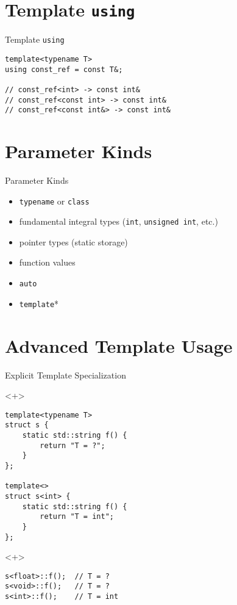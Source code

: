 \documentclass[table]{beamer}
\begin{document}
\section{Template \texttt{using}}

\begin{frame}[fragile]{Template \texttt{using}}
\begin{verbatim}
template<typename T>
using const_ref = const T&;

// const_ref<int> -> const int&
// const_ref<const int> -> const int&
// const_ref<const int&> -> const int&
  \end{verbatim}
\end{frame}

\section{Parameter Kinds}

\begin{frame}{Parameter Kinds}
  \begin{itemize}
  \item<+-> \texttt{typename} or \texttt{class}
  \item<+-> fundamental integral types (\texttt{int}, \texttt{unsigned int},
    etc.)
  \item<+-> pointer types (static storage)
  \item<+-> function values
  \item<+-> \texttt{auto}
  \item<+-> \texttt{template}*
  \end{itemize}
\end{frame}

\section{Advanced Template Usage}

\begin{frame}[fragile]{Explicit Template Specialization}
  \begin{onlyenv}<+>
    \begin{verbatim}
template<typename T>
struct s {
    static std::string f() {
        return "T = ?";
    }
};

template<>
struct s<int> {
    static std::string f() {
        return "T = int";
    }
};
    \end{verbatim}
  \end{onlyenv}

  \begin{onlyenv}<+>
    \begin{verbatim}
s<float>::f();  // T = ?
s<void>::f();   // T = ?
s<int>::f();    // T = int
    \end{verbatim}
  \end{onlyenv}
\end{frame}
\end{document}
